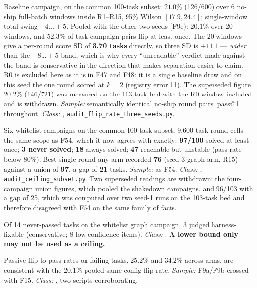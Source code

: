 \begin{description}[leftmargin=0pt,labelindent=0pt,labelsep=0pt,style=nextline,font=\normalfont,itemsep=6pt]
\item[\textbf{F15}\quad Same-config re-draw flip rate.]
Baseline campaign, on the common 100-task subset: \textbf{$21.0\%$}
(126/600) over 6 no-ship full-batch windows inside R1--R15, 95\% Wilson
$[17.9, 24.4]$; single-window total swing $-4\ldots{+}5$. Pooled with the
other two seeds (F9e): $20.1\%$ over 20 windows, and $52.3\%$ of
task-campaign pairs flip at least once. The 20 windows give a per-round
score SD of \textbf{3.70 tasks} directly, so three SD is $\pm 11.1$ ---
\emph{wider} than the $-8\ldots{+}5$ band, which is why every
``unreadable'' verdict made against the band is conservative in the
direction that makes separation easier to claim. R0 is excluded here as
it is in F47 and F48: it is a single baseline draw and on this seed the
one round scored at $k{=}2$ (registry error 11). The superseded figure
$20.2\%$ (146/721) was measured on the 103-task bed with the R0 window
included and is withdrawn. \emph{Sample:} semantically identical no-ship
round pairs, pass@1 throughout. \emph{Class:} ,
\texttt{audit\_flip\_rate\_three\_seeds.py}.

\item[\textbf{F16}\quad Reachability and reliability ceilings.]
Six whitelist campaigns on the common 100-task subset, 9{,}600 task-round
cells --- the same scope as F54, which it now agrees with exactly:
\textbf{97/100} solved at least once; \textbf{3 never solved};
\textbf{18} always solved; \textbf{47} reachable but unstable (pass rate
below $80\%$). Best single round any arm recorded \textbf{76}
(seed-3 graph arm, R15) against a union of \textbf{97}, a gap of
\textbf{21} tasks. \emph{Sample:} as F54. \emph{Class:} ,
\texttt{audit\_ceiling\_subset.py}. Two superseded readings are withdrawn:
the four-campaign union figures, which pooled the shakedown campaigns, and
96/103 with a gap of 25, which was computed over two seed-1 runs on the
103-task bed and therefore disagreed with F54 on the same family of
facts.

\item[\textbf{F17}\quad Reading of the never-passed queue.]
Of 14 never-passed tasks on the whitelist graph campaign, 3 judged
harness-fixable (conservative; 8 low-confidence items).
\emph{Class:} . \textbf{A lower bound only --- may not be used as a
ceiling.}

\item[\textbf{F18}\quad Base-rate consistency check.]
Passive flip-to-pass rates on failing tasks, $25.2\%$ and $34.2\%$ across
arms, are consistent with the $20.1\%$ pooled same-config flip rate.
\emph{Sample:} F9a/F9b crossed with F15. \emph{Class:} , two
scripts corroborating.


\end{description}
